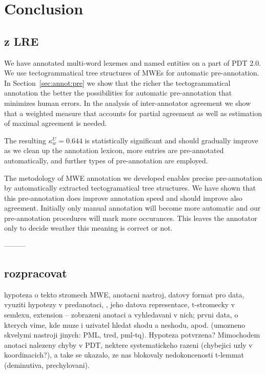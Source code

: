 
\chapter{Conclusion}
\label{sec:conclusion}
\todo

\section{z LRE}

We have annotated multi-word lexemes and named entities on a part of PDT 2.0. We use tectogrammatical tree structures of MWEs for automatic pre-annotation. In Section~\ref{sec:annot:pre} we show that the richer the tectogrammatical annotation the better the possibilities for automatic pre-annotation that minimizes human errors. In the analysis of inter-annotator agreement we show that a weighted measure that accounts for partial agreement as well as estimation of maximal agreement is needed. 

The resulting $\kappa_w^U = 0.644$ is statistically significant and should gradually improve as we clean up the annotation lexicon, more entries are pre-annotated automatically, and further types of pre-annotation are employed.

The metodology of MWE annotation we developed enables precise pre-annotation by automatically extracted tectogramatical tree structures. We have shown that this pre-annotation does improve annotation speed and should improve also agreement. Initially only manual annotation will become more automatic and our pre-annotation procedures will mark more occurances. This leaves the annotator only to decide weather this meaning is correct or not.

---------

\section{rozpracovat}
 hypoteza o tekto stromech MWE, anotacni nastroj, datovy format pro data, vyuziti hypotezy v predanotaci, \semlex, jeho datova representace, t-stromecky v semlexu, extension -- zobrazeni anotaci a vyhledavani v nich; prvni data, o kterych vime, kde muze i uzivatel hledat shodu a neshodu, apod. (umozneno skvelymi nastroji jinych: PML, tred, pml-tq). Hypoteza potvrzena? Mimochodem anotaci nalezeny chyby v PDT, nektere systematickeho razeni (chybejici uzly v koordinacich?), a take se ukazalo, ze nas blokovaly nedokoncenosti t-lemmat (deminutiva, prechylovani).

